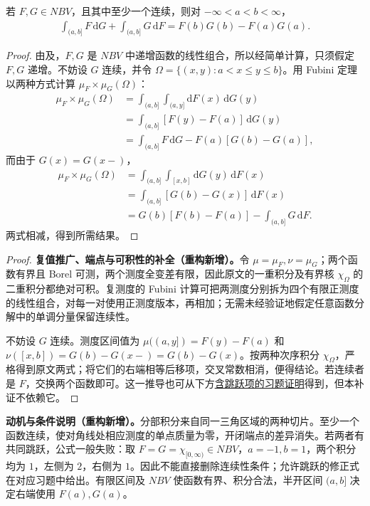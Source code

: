 \documentclass[../../main.tex]{subfiles}%
\begin{document}
\begin{theorem}\label{theorem:ch03-stieltjes-parts}
若 $F,G\in NBV$，且其中至少一个连续，则对 $-\infty<a<b<\infty$，
\begin{align*}
\int_{(a,b]}F\,\mathrm dG+\int_{(a,b]}G\,\mathrm dF
=F(b)G(b)-F(a)G(a).
\end{align*}
\end{theorem}
\begin{proof}
由及，$F,G$ 是 $NBV$ 中递增函数的线性组合，所以经简单计算，只须假定 $F,G$ 递增。不妨设 $G$ 连续，并令 $\Omega=\{(x,y):a<x\le y\le b\}$。用 Fubini 定理以两种方式计算 $\mu_F\times\mu_G(\Omega)$：
\begin{align*}
\mu_F\times\mu_G(\Omega)
&=\int_{(a,b]}\int_{(a,y]}\mathrm dF(x)\,\mathrm dG(y)\\
&=\int_{(a,b]}[F(y)-F(a)]\,\mathrm dG(y)\\
&=\int_{(a,b]}F\,\mathrm dG-F(a)[G(b)-G(a)],
\end{align*}
而由于 $G(x)=G(x-)$，
\begin{align*}
\mu_F\times\mu_G(\Omega)
&=\int_{(a,b]}\int_{[x,b]}\mathrm dG(y)\,\mathrm dF(x)\\
&=\int_{(a,b]}[G(b)-G(x)]\,\mathrm dF(x)\\
&=G(b)[F(b)-F(a)]-\int_{(a,b]}G\,\mathrm dF.
\end{align*}
两式相减，得到所需结果。
\end{proof}

\begin{proof}
\textbf{复值推广、端点与可积性的补全（重构新增）。}令 $\mu=\mu_F,\nu=\mu_G$；两个函数有界且 Borel 可测，两个测度全变差有限，因此原文的一重积分及有界核 $\chi_\Omega$ 的二重积分都绝对可积。复测度的 Fubini 计算可把两测度分别拆为四个有限正测度的线性组合，对每一对使用正测度版本，再相加；无需未经验证地假定任意函数分解中的单调分量保留连续性。

不妨设 $G$ 连续。测度区间值为 $\mu((a,y])=F(y)-F(a)$ 和 $\nu([x,b])=G(b)-G(x-)=G(b)-G(x)$。按两种次序积分 $\chi_\Omega$，严格得到原文两式；将它们的右端相等后移项，交叉常数相消，便得结论。若连续者是 $F$，交换两个函数即可。这一推导也可从下方\hyperref[solution:ch03-stieltjes-jump-parts]{含跳跃项的习题证明}得到，但本补证不依赖它。
\end{proof}
\begin{remark}
\textbf{动机与条件说明（重构新增）。}分部积分来自同一三角区域的两种切片。至少一个函数连续，使对角线处相应测度的单点质量为零，开闭端点的差异消失。若两者有共同跳跃，公式一般失败：取 $F=G=\chi_{[0,\infty)}\in NBV$，$a=-1,b=1$，两个积分均为 $1$，左侧为 $2$，右侧为 $1$。因此不能直接删除连续性条件；允许跳跃的修正式在对应习题中给出。有限区间及 $NBV$ 使函数有界、积分合法，半开区间 $(a,b]$ 决定右端使用 $F(a),G(a)$。
\end{remark}
\end{document}
